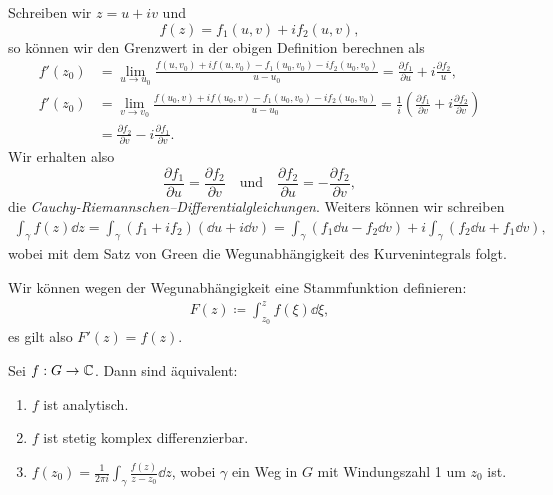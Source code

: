 \begin{remark}
    Schreiben wir $z = u + iv$ und
    $$ f(z) = f_1(u, v) + i f_2(u, v), $$
    so können wir den Grenzwert in der obigen Definition berechnen als
    \begin{align*}
        f'(z_0) &= \lim_{u \to u_0} \frac{f(u, v_0) + i f(u, v_0) - f_1(u_0, v_0) - i f_2(u_0, v_0)}{u - u_0} = \frac{\partial f_1}{\partial u} + i \frac{\partial f_2}{u}, \\
        f'(z_0) &= \lim_{v \to v_0} \frac{f(u_0, v) + i f(u_0, v) - f_1(u_0, v_0) - i f_2(u_0, v_0)}{u - u_0} = \frac{1}{i} \left( \frac{\partial f_1}{\partial v} + i \frac{\partial f_2}{\partial v} \right) \\
        &= \frac{\partial f_2}{\partial v} - i \frac{\partial f_1}{\partial v}.
    \end{align*}
    Wir erhalten also
    $$ \frac{\partial f_1}{\partial u} = \frac{\partial f_2}{\partial v} \quad \textrm{und} \quad \frac{\partial f_2}{\partial u} = - \frac{\partial f_2}{\partial v}, $$
    die \emph{Cauchy-Riemannschen--Differentialgleichungen}. Weiters können wir schreiben
    \begin{align*}
        \int_\gamma f(z) \dd z = \int_\gamma (f_1 + i f_2)(\dd u + i \dd v) = \int_\gamma (f_1 \dd u - f_2 \dd v) + i \int_\gamma (f_2 \dd u + f_1 \dd v),
    \end{align*}
    wobei mit dem Satz von Green die Wegunabhängigkeit des Kurvenintegrals folgt.
\end{remark}

\begin{remark}
    Wir können wegen der Wegunabhängigkeit eine Stammfunktion definieren:
    \begin{align*}
        F(z) \coloneqq \int_{z_0}^z f(\xi) \dd \xi,
    \end{align*}
    es gilt also $F'(z) = f(z)$.
\end{remark}

\begin{theorem}
    Sei $f : G \to \mathbb{C}$. Dann sind äquivalent:
    \begin{enumerate}
        \item $f$ ist analytisch.
        \item $f$ ist stetig komplex differenzierbar.
        \item $ \displaystyle f(z_0) = \frac{1}{2 \pi i} \int_\gamma \frac{f(z)}{z - z_0} \dd z $, wobei $\gamma$ ein Weg in $G$ mit Windungszahl 1 um $z_0$ ist.
    \end{enumerate}
\end{theorem}

